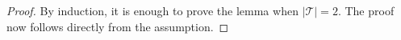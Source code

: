 \documentclass[journal, onecolumn]{IEEEtran}
\begin{document}
\begin{proof}By induction, it is enough to prove the lemma when $|\mathcal{T}| = 2$. The proof now follows directly from the assumption.
\end{proof}

\end{document}
